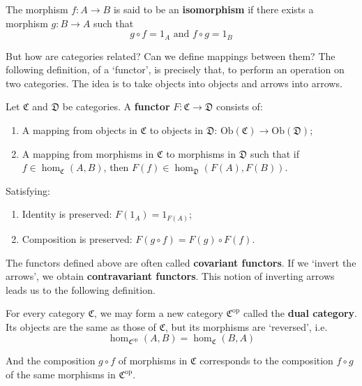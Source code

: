 \begin{definition}
	The morphism $f : A \longrightarrow B$ is said to be an \textbf{isomorphism} if there exists a morphism $g : B \longrightarrow A$ such that
	\[
		g \circ f = 1_A \text{ and } f \circ g = 1_B
	\] 
\end{definition}

But how are categories related? Can we define mappings between them? The following definition, of a `functor', is precisely that, to perform an operation on two categories. The idea is to take objects into objects and arrows into arrows.

\begin{definition}[Functor]
	Let $\mathfrak{C}$ and $\mathfrak{D}$ be categories. A \textbf{functor} $F : \mathfrak{C} \longrightarrow \mathfrak{D}$ consists of:
	\begin{enumerate}
		\item A mapping from objects in $\mathfrak{C}$ to objects in $\mathfrak{D}$: $\text{Ob} (\mathfrak{C}) \longrightarrow \text{Ob} (\mathfrak{D})$;
		\item A mapping from morphisms in $\mathfrak{C}$ to morphisms in $\mathfrak{D}$ such that if $f \in \hom_\mathfrak{C}(A,B)$, then $F(f) \in \hom_\mathfrak{D}(F(A), F(B))$.
	\end{enumerate}
	Satisfying:
	\begin{enumerate}
		\item Identity is preserved: $F(1_A) = 1_{F(A)}$;
		\item Composition is preserved: $F(g \circ f) = F(g) \circ F(f)$.
	\end{enumerate}
\end{definition}

The functors defined above are often called \textbf{covariant functors}. If we `invert the arrows', we obtain \textbf{contravariant functors}. This notion of inverting arrows leads us to the following definition.

\begin{definition}
	For every category $\mathfrak{C}$, we may form a new category $\mathfrak{C}^{\text{op}}$ called the \textbf{dual category}. Its objects are the same as those of $\mathfrak{C}$, but its morphisms are `reversed', i.e.
	\[
		\hom_{\mathfrak{C}^{\text{op}}}(A,B) = \hom_\mathfrak{C}(B,A)
	\]

	And the composition $g \circ f$ of morphisms in $\mathfrak{C}$ corresponds to the composition $f \circ g$ of the same morphisms in $\mathfrak{C}^{\text{op}}$.
\end{definition}

